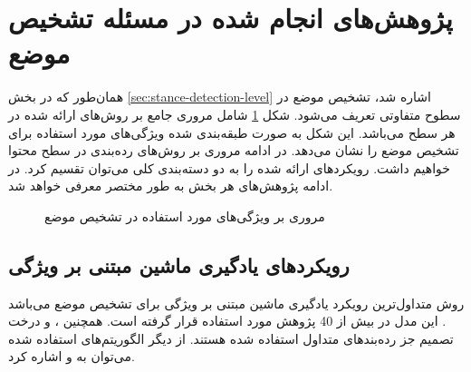 \section{پژوهش‌های انجام شده در مسئله تشخیص موضع}
همان‌طور که در بخش
\ref{sec:stance-detection-level}
اشاره شد، تشخیص موضع در سطوح متفاوتی تعریف می‌شود. شکل
\ref{stance_modeling_level}
شامل مروری جامع بر روش‌های ارائه شده در هر سطح می‌باشد. این شکل به صورت طبقه‌بندی شده ویژگی‌های مورد استفاده برای تشخیص موضع را نشان می‌دهد. در ادامه مروری بر روش‌های رده‌بندی در سطح محتوا
 خواهیم داشت. رویکردهای ارائه شده را به دو دسته‌بندی کلی می‌توان تقسیم کرد. در ادامه پژوهش‌های هر بخش به طور مختصر معرفی خواهد شد.
\begin{figure}
	\caption[مروری بر ویژگی‌های مورد استفاده در تشخیص موضع ]{مروری بر ویژگی‌های مورد استفاده در تشخیص موضع 
		\cite{Alturayeif2023} \label{stance_modeling_level}}
	
\end{figure}

\subsection[رویکردهای یادگیری ماشین مبتنی بر ویژگی]{رویکردهای یادگیری ماشین مبتنی بر ویژگی
	}
	
	روش
	متداول‌ترین رویکرد یادگیری ماشین مبتنی بر ویژگی برای تشخیص موضع می‌باشد
	\cite{10.1145/3097286.3097288, 10.1145/3132169, mohammad-etal-2016-semeval, 10.1145/3269206.3271783, Sobhani2016DetectingSI}. 
این مدل در بیش از 40 پژوهش مورد استفاده قرار گرفته است. همچنین
	\cite{Kucher2020, 10.1007/978-3-030-14687-0_16}،
	و درخت تصمیم جز رده‌بند‌های متداول استفاده شده هستند. از دیگر الگوریتم‌های استفاده شده می‌توان به
	و 
	\cite{10.1007/978-3-319-66429-3-70}
	اشاره کرد.


